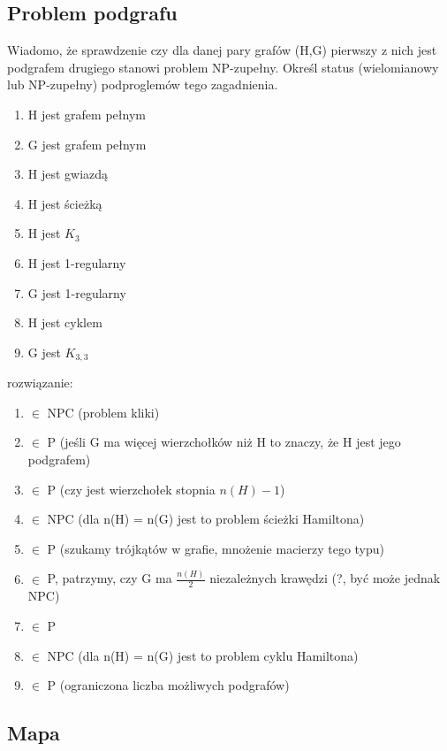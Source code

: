 \documentclass{article}
\begin{document}
\subsection*{Problem podgrafu}
Wiadomo, że sprawdzenie czy dla danej pary grafów (H,G) pierwszy z nich jest podgrafem drugiego stanowi problem NP-zupełny. Określ
status (wielomianowy lub NP-zupełny) podproglemów tego zagadnienia.
\begin{enumerate}
	\item H jest grafem pełnym
	\item G jest grafem pełnym
	\item H jest gwiazdą
	\item H jest ścieżką
	\item H jest $K_3$
	\item H jest 1-regularny
	\item G jest 1-regularny
	\item H jest cyklem
	\item G jest $K_{3,3}$
\end{enumerate}
rozwiązanie: \\
\begin{enumerate}
	\item $\in$ NPC (problem kliki)
	\item $\in$ P (jeśli G ma więcej wierzchołków niż H to znaczy, że H jest jego podgrafem)
	\item $\in$ P (czy jest wierzchołek stopnia $n(H)-1$)
	\item $\in$ NPC (dla n(H) = n(G) jest to problem ścieżki Hamiltona)
	\item $\in$ P (szukamy trójkątów w grafie, mnożenie macierzy tego typu)
	\item $\in$ P, patrzymy, czy G ma $\frac{n(H)}{2}$ niezależnych krawędzi (?, być może jednak NPC)
	\item $\in$ P
	\item $\in$ NPC (dla n(H) = n(G) jest to problem cyklu Hamiltona)
	\item $\in$ P (ograniczona liczba możliwych podgrafów)
\end{enumerate}

\subsection*{Mapa}
\end{document}
